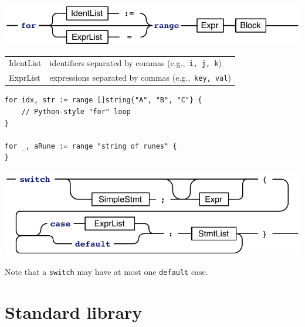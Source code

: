 \documentclass{article}
\begin{document}
\begin{multicols*}{3}
  \filbreak
  \includegraphics[width=\linewidth]{for-range}

  \begin{tabular}{p{0.35in}p{2.65in}}
  IdentList & identifiers separated by commas (e.g.,~\lstinline!i, j, k!) \\
  ExprList & expressions separated by commas (e.g.,~\lstinline!key, val!) \\
  \end{tabular}

  \vspace{\baselineskip}
\begin{lstlisting}[frame=single,escapechar=|]
for idx, str := range []string{"A", "B", "C"} {
    // Python-style "for" loop
}

for _, aRune := range "string of runes" {
}
\end{lstlisting}

  \filbreak
  \includegraphics[width=\linewidth]{switch-expr}

  Note that a \lstinline{switch} may have at most one \lstinline{default} case.

  \filbreak
  \section*{Standard library}


\end{multicols*}
\end{document}
